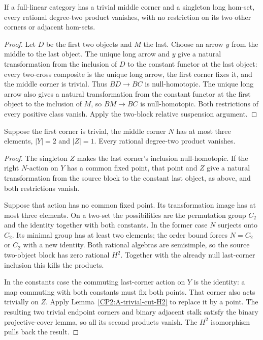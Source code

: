 \begin{lemma}
\label{CP2:A-trivial-middle-singleton-long}
If a full-linear category has a trivial middle corner
and a singleton long hom-set, every rational
degree-two product vanishes, with no restriction on
its two other corners or adjacent hom-sets.
\end{lemma}
\begin{proof}
Let $D$ be the first two objects and $M$ the last.
Choose an arrow $y$ from the middle to the last object.
The unique long arrow and $y$ give a natural
transformation from the inclusion of $D$ to the
constant functor at the last object: every two-cross
composite is the unique long arrow, the first corner
fixes it, and the middle corner is trivial.
Thus $BD\to BC$ is null-homotopic. The unique long
arrow also gives a natural transformation from the
constant functor at the first object to the inclusion
of $M$, so $BM\to BC$ is null-homotopic.
Both restrictions of every positive class vanish.
Apply the two-block relative suspension argument.
\end{proof}

\begin{lemma}
\label{CP2:A-small-middle-binary-singleton-long}
Suppose the first corner is trivial, the middle corner
$N$ has at most three elements, $|Y|=2$ and $|Z|=1$.
Every rational degree-two product vanishes.
\end{lemma}
\begin{proof}
The singleton $Z$ makes the last corner's inclusion
null-homotopic. If the right $N$-action on $Y$ has a
common fixed point, that point and $Z$ give a natural
transformation from the source block to the constant
last object, as above, and both restrictions vanish.

Suppose that action has no common fixed point. Its
transformation image has at most three elements. On
a two-set the possibilities are the permutation
group $C_2$ and the identity together with both
constants. In the former case $N$ surjects onto
$C_2$. Its minimal group has at least two elements;
the order bound forces $N=C_2$ or $C_2$ with a new
identity. Both rational algebras are semisimple, so
the source two-object block has zero rational $H^2$.
Together with the already null last-corner inclusion
this kills the products.

In the constants case the commuting last-corner
action on $Y$ is the identity: a map commuting with
both constants must fix both points. That corner
also acts trivially on $Z$. Apply
Lemma~\ref{CP2:A-trivial-cut-H2} to replace it by a
point. The resulting two trivial endpoint corners
and binary adjacent stalk satisfy the binary
projective-cover lemma, so all its second products
vanish. The $H^2$ isomorphism pulls back the result.
\end{proof}

